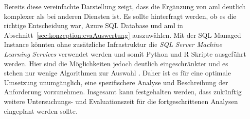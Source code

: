 Bereits diese vereinfachte Darstellung zeigt, dass die Ergänzung von \ac{aml} deutlich komplexer als bei anderen Diensten ist. Es sollte hinterfragt werden, ob es die richtige Entscheidung war, Azure SQL Database und \ac{aml} in Abschnitt~\ref{sec:konzeption:evaAuswertung} auszuwählen. Mit der SQL Managed Instance könnten ohne zusätzliche Infrastruktur die \textit{SQL Server Machine Learning Services} verwendet werden und somit Python und R Skripte ausgeführt werden. Hier sind die Möglichkeiten jedoch deutlich eingeschränkter und es stehen nur wenige Algorithmen zur Auswahl \cite{etaati_introduction_2019}. Daher ist es für eine optimale Umsetzung unumgänglich, eine spezifischere Analyse und Beschreibung der Anforderung vorzunehmen. Insgesamt kann festgehalten werden, dass zukünftig weitere Untersuchungs- und Evaluationszeit für die fortgeschrittenen Analysen eingeplant werden sollte.